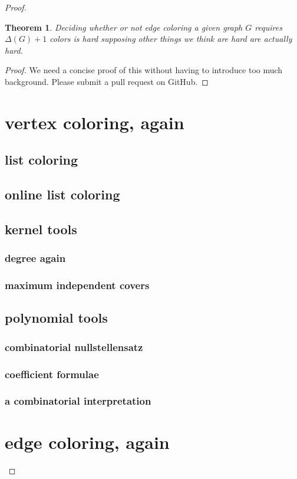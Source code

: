 \documentclass{amsbook}
\theoremstyle{plain}
\newtheorem{theorem}{Theorem}
\numberwithin{equation}{chapter}
\begin{document}
\begin{proof}
\begin{theorem}
Deciding whether or not edge coloring a given graph $G$ requires $\Delta(G) + 1$ colors is hard supposing other things we think are hard are actually hard.
\end{theorem}
\begin{proof}
We need a concise proof of this without having to introduce too much background.  Please submit a pull request on GitHub.
\end{proof}

\chapter*{vertex coloring, again}
\section*{list coloring}
\section*{online list coloring}
\section*{kernel tools}
\subsection*{degree again}
\subsection*{maximum independent covers}
\section*{polynomial tools}
\subsection*{combinatorial nullstellensatz}
\subsection*{coefficient formulae}
\subsection*{a combinatorial interpretation}

\chapter*{edge coloring, again}

\end{proof}
\end{document}
